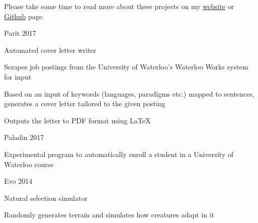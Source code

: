 


Please take some time to read more about these projects on my
\href{https://loukidelis.com/projects.html}{website} or
\href{https://github.com/splouk}{Github} page.

\begin{cventries}

  \cvproj
    {} %
    {Parit} %
    {} %
    {2017} %
    {
      \begin{cvitems} %
        \item {Automated cover letter writer}
        \item {Scrapes job postings from the University of Waterloo's
            Waterloo Works system for input}
        \item {Based on an input of keywords (languages, paradigms
            etc.) mapped to sentences, generates a cover letter tailored to
            the given posting}
        \item {Outputs the letter to PDF format using LaTeX}
      \end{cvitems}
    }

  \cvproj
    {} %
    {Paladin} %
    {} %
    {2017} %
    {
      \begin{cvitems} %
        \item{Experimental program to automatically enroll a student in a
            University of Waterloo course}
      \end{cvitems}
    }

  \cvproj
    {} %
    {Evo} %
    {} %
    {2014} %
    {
      \begin{cvitems} %
        \item {Natural selection simulator}
        \item {Randomly generates
            terrain and simulates how creatures adapt in it}
      \end{cvitems}
    }


\end{cventries}
